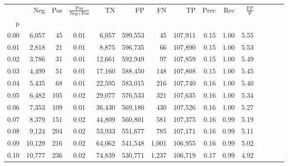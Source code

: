\begin{tabular}{rrrcrrrrrrrrrrr}
\toprule
{} &     Neg &    Pos & $\frac{\text{Pos}}{\text{Neg}+\text{Pos}}$ &       TN &       FP &       FN &       TP &  Prec &   Rec & $\frac{\text{FP}}{\text{P}}$ \\
p    &         &        &                                            &          &          &          &          &       &       &                              \\
\midrule
0.00 &   6,057 &     45 &                                       0.01 &    6,057 &  599,553 &       45 &  107,911 &  0.15 &  1.00 &                         5.55 \\
0.01 &   2,818 &     21 &                                       0.01 &    8,875 &  596,735 &       66 &  107,890 &  0.15 &  1.00 &                         5.53 \\
0.02 &   3,786 &     31 &                                       0.01 &   12,661 &  592,949 &       97 &  107,859 &  0.15 &  1.00 &                         5.49 \\
0.03 &   4,499 &     51 &                                       0.01 &   17,160 &  588,450 &      148 &  107,808 &  0.15 &  1.00 &                         5.45 \\
0.04 &   5,435 &     68 &                                       0.01 &   22,595 &  583,015 &      216 &  107,740 &  0.16 &  1.00 &                         5.40 \\
0.05 &   6,482 &    105 &                                       0.02 &   29,077 &  576,533 &      321 &  107,635 &  0.16 &  1.00 &                         5.34 \\
0.06 &   7,353 &    109 &                                       0.01 &   36,430 &  569,180 &      430 &  107,526 &  0.16 &  1.00 &                         5.27 \\
0.07 &   8,379 &    151 &                                       0.02 &   44,809 &  560,801 &      581 &  107,375 &  0.16 &  0.99 &                         5.19 \\
0.08 &   9,124 &    204 &                                       0.02 &   53,933 &  551,677 &      785 &  107,171 &  0.16 &  0.99 &                         5.11 \\
0.09 &  10,129 &    216 &                                       0.02 &   64,062 &  541,548 &    1,001 &  106,955 &  0.16 &  0.99 &                         5.02 \\
0.10 &  10,777 &    236 &                                       0.02 &   74,839 &  530,771 &    1,237 &  106,719 &  0.17 &  0.99 &                         4.92 \\

\end{tabular}
